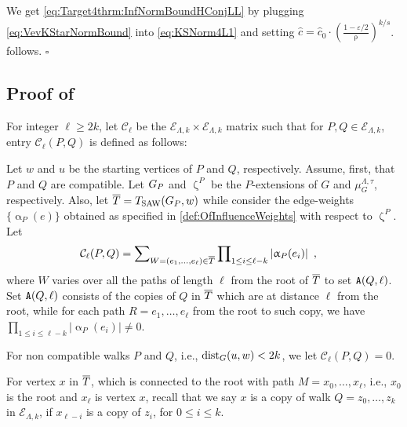 \documentclass[11pt,reqno]{amsart}
\numberwithin{equation}{section}
\newcommand{\cC}{{\mathcal{C}}}
\newcommand{\cE}{{\mathcal{E}}}
\newcommand{\applegreen}[1]{ {\color{applegreen}#1}}
\newcommand{\amethyst}[1]{{\color{amethyst}#1} }
\newcommand{\blue}[1]{{\color{blue}#1}}
\newcommand{\bluepigment}[1]{{\color{blue(pigment)}#1}}
\newcommand{\bostonuniversityred}[1]{{\color{bostonuniversityred}#1}}
\newcommand{\capri}[1]{{\color{capri}#1}}
\newcommand{\cadmiumgreen}[1]{{\color{cadmiumgreen}#1}}
\newcommand{\darkmagenta}[1]{{\color{darkmagenta}#1}}
\newcommand{\goldenbrown}[1]{{\color{goldenbrown}#1}}
\newcommand{\heliotrope}[1]{{\color{heliotrope}#1}}
\newcommand{\iris}[1]{{\color{iris}#1}}
\newcommand{\red}[1]{{\color{red}#1}}
\newcommand{\dist}{{\rm dist}}
\newcommand{\ExtV}{\iris{\cE}}
\newcommand{\pfs}{\darkmagenta{s}}
\newcommand{\Tsaw}{T_{\rm SAW}}
\newcommand{\cp}{{\tt A}}
\newcommand{\abs}[1]{\blue{|}#1\blue{|}}
\renewcommand{\applegreen}[1]{#1}
\renewcommand{\amethyst}[1]{#1}
\renewcommand{\blue}[1]{#1}
\renewcommand{\bluepigment}[1]{#1}
\renewcommand{\bostonuniversityred}[1]{#1}
\renewcommand{\capri}[1]{#1}
\renewcommand{\cadmiumgreen}[1]{#1}
\renewcommand{\darkmagenta}[1]{#1}
\renewcommand{\goldenbrown}[1]{#1}
\renewcommand{\heliotrope}[1]{#1}
\renewcommand{\iris}[1]{#1}
\renewcommand{\red}[1]{#1}
\newcommand{\ke}{\blue{e}}
\newcommand{\ki}{\capri{i}}
\newcommand{\kk}{\bluepigment{k}}
\newcommand{\kell}{{\color{green(pigment)}\ell}}%
\newcommand{\kP}{\goldenbrown{P}}
\newcommand{\kQ}{\amethyst{Q}}
\newcommand{\kR}{\bostonuniversityred{R}}%
\newcommand{\ku}{\red{u}}
\newcommand{\kW}{\blue{W}}
\newcommand{\kw}{\blue{w}}
\newcommand{\kx}{\heliotrope{x}}
\newcommand{\kz}{\cadmiumgreen{z}}
\renewcommand{\ke}{e}
\renewcommand{\ki}{i}
\renewcommand{\kk}{k}
\renewcommand{\kell}{\ell}
\renewcommand{\kP}{P}
\renewcommand{\kQ}{Q}
\renewcommand{\kR}{R}
\renewcommand{\ku}{u}
\renewcommand{\kW}{W}
\renewcommand{\kw}{w}
\renewcommand{\kx}{x}
\renewcommand{\kz}{z}
\newcommand{\infweight}{\upalpha}
\newcommand{\SingBound}{\uprho}
\begin{document}
We get \eqref{eq:Target4thrm:InfNormBoundHConjLL} by plugging \eqref{eq:VevKStarNormBound} into \eqref{eq:KSNorm4L1}
and setting $\widehat{c}=\widehat{c}_0\cdot \left(\frac{1-\varepsilon/2}{\SingBound}\right)^{\kk/\pfs}$. 
%
  follows. 
%
 \hfill $\square$


\newcommand{\SimpleExtdInfMatrixL}{\cC}
\newcommand{\SimpleFvec}{\upz}



\subsection{Proof of }\label{sec:thrm:HC-VEntryBound}


For integer $\kell\geq 2\kk$, let $\SimpleExtdInfMatrixL_{\kell}$ be the $\ExtV_{\Lambda,\kk}\times \ExtV_{\Lambda,\kk}$ matrix 
such that for $\kP,\kQ \in \ExtV_{\Lambda,\kk}$, entry $\SimpleExtdInfMatrixL_{\kell}(\kP,\kQ)$ is defined as follows:





Let  $\kw$ and $\ku$ be the starting vertices of $\kP$ and $\kQ$, respectively. Assume, first,  that $\kP$ and $\kQ$ are compatible.
Let $\gext{G}{\kP}$ and $\upzeta^{\kP}$ be the $\kP$-extensions of $G$ and  $\mu^{\Lambda,\tau}_G$, respectively. 
%
Also,  let $\TPP=\Tsaw(\gext{G}{\kP}, \kw)$ while consider the edge-weights 
$\{\infweight_{\kP}(\ke)\}$ obtained as specified in \eqref{def:OfInfluenceWeights} with respect to $\upzeta^{\kP}$. 
%
Let 
\begin{align}\nonumber
\SimpleExtdInfMatrixL_{\kell}(\kP, \kQ) &=\sum\nolimits_{\kW=(\ke_1, \ldots, \ke_{\kell})\in\TPP} \prod\nolimits_{1\leq \ki \leq \kell-\kk} \abs{ \infweight_{\kP}(\ke_{\ki})} \enspace, 
\end{align}
where $\kW$ varies over all the paths of length $\kell$ from the root of $\overline{T}$ to set $\cp(\kQ,\kell)$. Set $\cp(\kQ,\kell)$ consists of the 
copies of $\kQ$ in $\overline{T}$  which are at distance $\kell$ from the root, while for each path $\kR=\ke_1,\ldots, \ke_{\kell}$ from the root to 
 such copy, we have $\prod\nolimits_{1\leq \ki \leq \kell-\kk} \abs{ \infweight_{\kP}(\ke_{\ki})}\neq 0$. 


For non compatible walks $\kP$ and $\kQ$, i.e., $\dist_{G}(\ku,\kw)<2\kk$,  we let $\SimpleExtdInfMatrixL_{\kell}(\kP, \kQ) =0$. 

For vertex $\kx$ in $\overline{T}$, which is connected to the root with path 
$M=\kx_0, \ldots, \kx_{\kell}$, i.e., $\kx_0$ is the root and $\kx_{\kell}$ is vertex $\kx$, 
recall that we say $\kx$ is a copy of walk $\kQ=\kz_0,\ldots, \kz_{\kk}$ in $\ExtV_{\Lambda,\kk}$,
if $\kx_{\kell-\ki}$ is a copy of $\kz_{\ki}$, for $0\leq \ki\leq \kk$.
%
\end{document}
